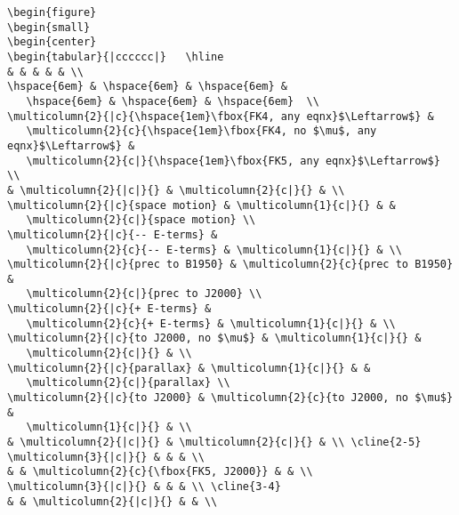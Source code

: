 {\footnotesize
\begin{verbatim}
\begin{figure}
\begin{small}
\begin{center}
\begin{tabular}{|cccccc|}   \hline
& & & & & \\
\hspace{6em} & \hspace{6em} & \hspace{6em} &
   \hspace{6em} & \hspace{6em} & \hspace{6em}  \\
\multicolumn{2}{|c}{\hspace{1em}\fbox{FK4, any eqnx}$\Leftarrow$} &
   \multicolumn{2}{c}{\hspace{1em}\fbox{FK4, no $\mu$, any eqnx}$\Leftarrow$} &
   \multicolumn{2}{c|}{\hspace{1em}\fbox{FK5, any eqnx}$\Leftarrow$} \\
& \multicolumn{2}{|c|}{} & \multicolumn{2}{c|}{} & \\
\multicolumn{2}{|c}{space motion} & \multicolumn{1}{c|}{} & &
   \multicolumn{2}{c|}{space motion} \\
\multicolumn{2}{|c}{-- E-terms} &
   \multicolumn{2}{c}{-- E-terms} & \multicolumn{1}{c|}{} & \\
\multicolumn{2}{|c}{prec to B1950} & \multicolumn{2}{c}{prec to B1950} &
   \multicolumn{2}{c|}{prec to J2000} \\
\multicolumn{2}{|c}{+ E-terms} &
   \multicolumn{2}{c}{+ E-terms} & \multicolumn{1}{c|}{} & \\
\multicolumn{2}{|c}{to J2000, no $\mu$} & \multicolumn{1}{c|}{} &
   \multicolumn{2}{c|}{} & \\
\multicolumn{2}{|c}{parallax} & \multicolumn{1}{c|}{} & &
   \multicolumn{2}{c|}{parallax} \\
\multicolumn{2}{|c}{to J2000} & \multicolumn{2}{c}{to J2000, no $\mu$} &
   \multicolumn{1}{c|}{} & \\
& \multicolumn{2}{|c|}{} & \multicolumn{2}{c|}{} & \\ \cline{2-5}
\multicolumn{3}{|c|}{} & & & \\
& & \multicolumn{2}{c}{\fbox{FK5, J2000}} & & \\
\multicolumn{3}{|c|}{} & & & \\ \cline{3-4}
& & \multicolumn{2}{|c|}{} & & \\

\end{verbatim}}
